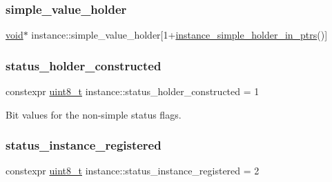 \subsubsection{\texorpdfstring{simple\_value\_holder}{simple\_value\_holder}}
{\footnotesize\ttfamily \mbox{\hyperlink{_s_d_l__opengles2__gl2ext_8h_ae5d8fa23ad07c48bb609509eae494c95}{void}}$\ast$ instance\+::simple\+\_\+value\+\_\+holder\mbox{[}1+\mbox{\hyperlink{detail_2common_8h_a24241089c1b051b143781ff5a6193a76}{instance\+\_\+simple\+\_\+holder\+\_\+in\+\_\+ptrs}}()\mbox{]}}

\mbox{\label{structinstance_a2d8ccf4b4d7dcb8083cee8cc030ec871}} 
\subsubsection{\texorpdfstring{status\_holder\_constructed}{status\_holder\_constructed}}
{\footnotesize\ttfamily constexpr \mbox{\hyperlink{_s_d_l__config_8h_aba7bc1797add20fe3efdf37ced1182c5}{uint8\+\_\+t}} instance\+::status\+\_\+holder\+\_\+constructed = 1\hspace{0.3cm}{\ttfamily [static]}}



Bit values for the non-\/simple status flags. 

\mbox{\label{structinstance_a48612cbb682f9b16cbaeba60f1bca052}} 
\subsubsection{\texorpdfstring{status\_instance\_registered}{status\_instance\_registered}}
{\footnotesize\ttfamily constexpr \mbox{\hyperlink{_s_d_l__config_8h_aba7bc1797add20fe3efdf37ced1182c5}{uint8\+\_\+t}} instance\+::status\+\_\+instance\+\_\+registered = 2\hspace{0.3cm}{\ttfamily [static]}}

\mbox{\label{structinstance_a23dd4c6144dbfa8ed0ba6d2a7a964998}} 

